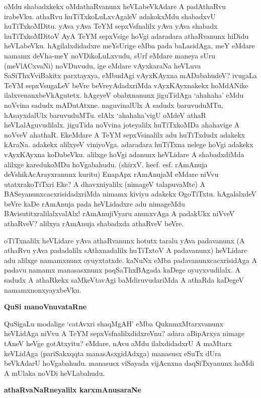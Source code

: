 \noindent
oMdu shabadxkekx oMdathaRvanunx heVLabeVkAdare A padAthaRvu irabeVku. 
athaRvu huTiTxkoLuLxvAgaleV adakokxMdu shabadxvU huTiTxkoMDitu. yAva 
yAva TeYM sepxVsfnalilx yAva yAva shabadx huTiTxkoMDitoV AyA TeYM 
sepxVsige hoVgi adaradara athaRvanunx hiDidu heVLabeVku. 
hAgilalxdidadxre meYsUrige eMba pada baLasidAga, meY eMdare namamx 
deVha-meY noVDikoLuLxvudu, sUrf eMdare maneya sUru (meVlACxvaNi) 
noVDuvudu, ige eMdare vAyxkaraNa heVLuva SaSiThxVviBakitx parxtayxya, 
eMbudAgi vAyxKAyxna mADabahudeV? ivugaLa TeYM sepxVsugaLeV beVre beVreyAdadxriMda vAyxKAyxnakekx hoMdANike  ilalxvenanxbeVkAgutetx. hAgeyeV obabxnanunx jiguTidAga `ahahaha' eMdu noVvina sadudx mADutAtxne. naguvinalUlx A sadudx baruvuduMTu, hAsayxdalUlx baruvuduMTu. elAlx `ahahaha'vigU oMdeV athaR heVLalAguvudilalx. jiguTida noVvina joteyalilx huTiTxkoMDa ahahavige A noVveV ahathaR. EkeMdare A TeYM sepxVsinalilx adu huTiTxdudx adakekx kAraNa. adakekx alilxyeV viniyoVga. adaradara huTiTxna nelege hoVgi adakekx vAyxKAyxna koDabeVku. alilxge hoVgi adanunx heVLidare A shabadxdiMda alilxge karedukoMDu hoVgabahudu.  (shirxV. hecf. esf. rAmAnuja deVshikAcArayxranunx kuritu) EnapApx rAmAnujaM eMdare niVvu utatxrakoTiTxri Eke? A dhavxniyalilx (nimageV talapuvaMte) A BASeyanunxcacxrisidadxriMda nimamx kiviyu adakekx OgoTiTxtu. hAgalalxdeV beVre kaDe rAmAnuja pada heVLidadxre adu nimageMdu BAvisutitxralilalxvalAlx! rAmAnujiVyaru anunxvAga A padakUkx niVveV athaRveV? alilxya rAmAnuja shabadxda athaRveV beVre. 

oTiTxnalilx heVLidare yAva athaRvanunx hotutx taralu yAva padavanunx (A athaRvu yAva padadalilx sAthxnadalilx huTiTxtoV A padavanunx) heVLidare adu alilxge namamxnunx oyuyxtatxde.  kaNuNx eMba padavanunxcacxrisidAga A padavu namamx manasasxnunx paqSaThxBAgada kaDege oyuyxvudilalx. A sadudx A athaRkekx saMkeVtavAgi baMdiruvudariMda A athaRda kaDegeV namamxnonxyayxbeVku.

{\bigskip
\noindent
{\large\bf QuSi manoVnuvataRne}}\label{page114}
\medskip

\noindent
QuSigaLu modalige `catAvxri shaqMgAH' eMba QuknmxMtarxvanunx heVLidAga niVvu A TeYM sepxVsfnalilxdidxreVnu? adara aBipArxya nimage tAneV heVge gotAtxyitu? eMdare, nAvu aMdu ilalxdidadxrU A maMtarx keVLidAga (pariSakxqqta manasAsxgidAdxga) manasusx eSuTx dUra beVkAdarU hoVgabahudu. manasusx viSayada vijAcnxna daqSiTxyanunx hoMdi A mUlaka noVDi heVLabahudu.

{\bigskip
\noindent
{\large\bf athaRvaNaRneyalilx karxmAnusaraNe}}\label{page144}
\medskip

